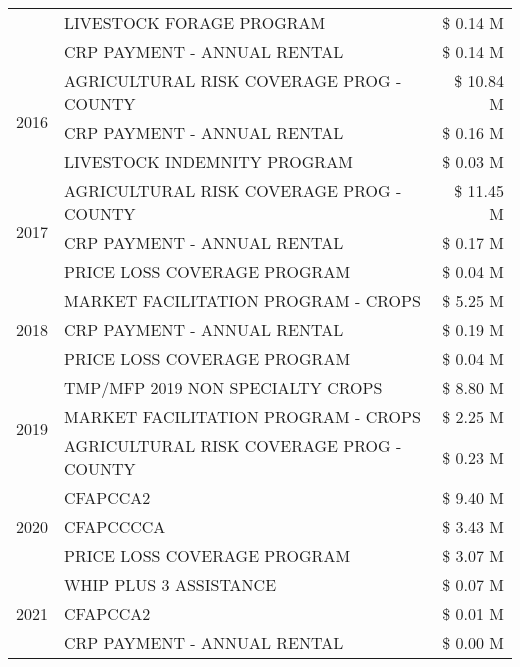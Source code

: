 \begin{tabular}{llr}
 & LIVESTOCK FORAGE PROGRAM & \$ 0.14 M \\
 & CRP PAYMENT - ANNUAL RENTAL & \$ 0.14 M \\
\cline{1-3}
\multirow[t]{3}{*}{2016} & AGRICULTURAL RISK COVERAGE PROG - COUNTY & \$ 10.84 M \\
 & CRP PAYMENT - ANNUAL RENTAL & \$ 0.16 M \\
 & LIVESTOCK INDEMNITY PROGRAM & \$ 0.03 M \\
\cline{1-3}
\multirow[t]{3}{*}{2017} & AGRICULTURAL RISK COVERAGE PROG - COUNTY & \$ 11.45 M \\
 & CRP PAYMENT - ANNUAL RENTAL & \$ 0.17 M \\
 & PRICE LOSS COVERAGE PROGRAM & \$ 0.04 M \\
\cline{1-3}
\multirow[t]{3}{*}{2018} & MARKET FACILITATION PROGRAM - CROPS & \$ 5.25 M \\
 & CRP PAYMENT - ANNUAL RENTAL & \$ 0.19 M \\
 & PRICE LOSS COVERAGE PROGRAM & \$ 0.04 M \\
\cline{1-3}
\multirow[t]{3}{*}{2019} & TMP/MFP 2019 NON SPECIALTY CROPS & \$ 8.80 M \\
 & MARKET FACILITATION PROGRAM - CROPS & \$ 2.25 M \\
 & AGRICULTURAL RISK COVERAGE PROG - COUNTY & \$ 0.23 M \\
\cline{1-3}
\multirow[t]{3}{*}{2020} & CFAPCCA2 & \$ 9.40 M \\
 & CFAPCCCCA & \$ 3.43 M \\
 & PRICE LOSS COVERAGE PROGRAM & \$ 3.07 M \\
\cline{1-3}
\multirow[t]{3}{*}{2021} & WHIP PLUS 3 ASSISTANCE & \$ 0.07 M \\
 & CFAPCCA2 & \$ 0.01 M \\
 & CRP PAYMENT - ANNUAL RENTAL & \$ 0.00 M \\
\cline{1-3}
\bottomrule
\end{tabular}
